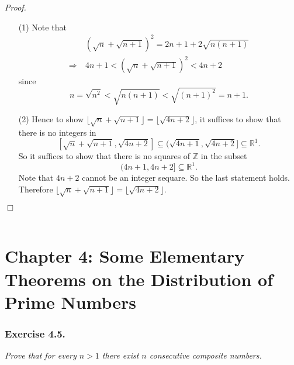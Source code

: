 \documentclass{article}
\begin{document}
\emph{Proof.}
\begin{enumerate}
\item[(1)]
  Note that
  \begin{align*}
    &\: (\sqrt{n} + \sqrt{n+1})^2 = 2n+1 + 2 \sqrt{n(n+1)} \\
    \Longrightarrow &\:
    4n+1 < (\sqrt{n} + \sqrt{n+1})^2 < 4n+2
  \end{align*}
  since
  \[
    n = \sqrt{n^2} < \sqrt{n(n+1)} < \sqrt{(n+1)^2} = n+1.
  \]

\item[(2)]
  Hence to show $\lfloor \sqrt{n} + \sqrt{n+1} \rfloor = \lfloor \sqrt{4n+2} \rfloor$,
  it suffices to show that there is no integers in
  \[
    [\sqrt{n} + \sqrt{n+1}, \sqrt{4n+2}]
    \subseteq (\sqrt{4n+1}, \sqrt{4n+2}]
    \subseteq \mathbb{R}^1.
  \]
  So it suffices to show that there is no squares of $\mathbb{Z}$ in the subset
  \[
    (4n+1, 4n+2] \subseteq \mathbb{R}^1.
  \]
  Note that $4n+2$ cannot be an integer sequare.
  So the last statement holds.
  Therefore $\lfloor \sqrt{n} + \sqrt{n+1} \rfloor = \lfloor \sqrt{4n+2} \rfloor$.
\end{enumerate}
$\Box$ \\\\









\newpage
\section*{Chapter 4: Some Elementary Theorems on the Distribution of Prime Numbers \\}



\subsubsection*{Exercise 4.5.}
\emph{Prove that for every $n>1$ there exist $n$ consecutive composite numbers.} \\
\end{document}
